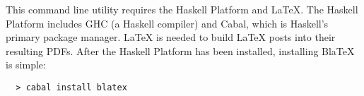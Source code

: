   This command line utility requires the Haskell Platform and LaTeX. The Haskell Platform includes GHC (a Haskell compiler) and Cabal, which is Haskell's primary package manager. LaTeX is needed to build LaTeX posts into their resulting PDFs. After the Haskell Platform has been installed, installing BlaTeX is simple:

  \begin{lstlisting}
  > cabal install blatex
  \end{lstlisting}